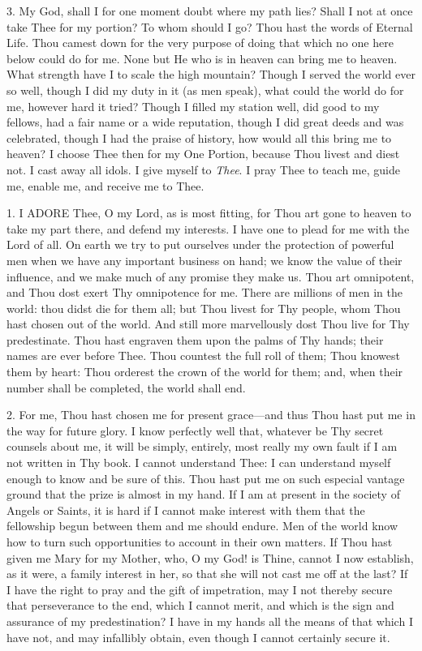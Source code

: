 3. My God, shall I for one
moment doubt where my path lies? Shall I not at once take Thee for my
portion? To whom should I go? Thou hast the words of Eternal Life.
Thou camest down for the very purpose of doing that which no one here
below could do for me. None but He who is in heaven can bring me to
heaven. What strength have I to scale the high mountain? Though I served
the world ever so well, though I did my duty in it (as men speak), what
could the world do for me, however hard it tried? Though I filled my
station well, did good to my fellows, had a fair name or a wide
reputation, though I did great deeds and was celebrated, though I had
the praise of history, how would all this bring me to heaven? I choose
Thee then for my One Portion, because Thou livest and diest not. I cast
away all idols. I give myself to \emph{Thee}. I pray Thee to teach me,
guide me, enable me, and receive me to Thee.


1. I ADORE
Thee, O my Lord, as is most fitting, for Thou art gone to heaven to take
my part there, and defend my interests. I have one to plead for me with
the Lord of all. On earth we try to put ourselves under the protection
of powerful men when we have any important business on hand; we know the
value of their influence, and we make much of any promise they make us.
Thou art omnipotent, and Thou dost exert Thy omnipotence for me. There
are millions of men in the world: thou didst die for them all; but Thou
livest for Thy people, whom Thou hast chosen out of the world. And
still more marvellously dost Thou live for Thy predestinate. Thou hast
engraven them upon the palms of Thy hands; their names are ever before
Thee. Thou countest the full roll of them; Thou knowest them by heart:
Thou orderest the crown of the world for them; and, when their number
shall be completed, the world shall end.

2. For me, Thou hast chosen me
for present grace—and thus Thou hast put me in the way for future
glory. I know perfectly well that, whatever be Thy secret counsels about
me, it will be simply, entirely, most really my own fault if I am not
written in Thy book. I cannot understand Thee: I can understand myself
enough to know and be sure of this. Thou hast put me on such especial
vantage ground that the prize is almost in my hand. If I am at present
in the society of Angels or Saints, it is hard if I cannot make interest
with them that the fellowship begun between them and me should endure.
Men of the world know how to turn such opportunities to account in their
own matters. If Thou hast given me Mary for my Mother, who, O my God! is
Thine, cannot I now establish, as it were, a family interest in her, so
that she will not cast me off at the last? If I have the right to pray
and the gift of impetration, may I not thereby secure that perseverance
to the end, which I cannot merit, and which is the sign and assurance of
my predestination? I have in my hands all the means of that which I have
not, and may infallibly obtain, even though I cannot certainly secure
it.

